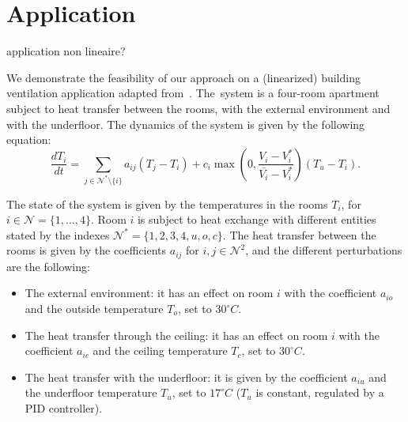  \section{Application}\label{sec:application}

{\todo application non lineaire?}
 
We demonstrate the feasibility of our approach on a (linearized) building
ventilation application adapted from~\cite{meyer:tel-01232640}.
The~system is a four-room apartment subject to heat transfer between
the rooms, with the external environment and with the underfloor.
The dynamics of the system is given by the
following equation:
\begin{equation}
 \frac{d T_i}{dt} = \sum_{j \in \mathcal{N}^\text{*}\setminus \{i\}} a_{ij} (T_j -
 T_i)
 + c_i
 \max\left(0,\frac{V_i - V_i^\text{*}}{\bar{ V_i} -
   V_i^{\text{*}}}\right)(T_u - T_i).
\end{equation}

The state of the system is given by the temperatures in the rooms
$T_i$, for $i \in \mathcal{N} = \{ 1 , \dots , 4 \}$.  Room $i$ is
subject to heat exchange with different entities stated by the indexes
$\mathcal{N}^\text{*} = \{1,2,3,4,u,o,c \}$.
%
The heat
transfer between the rooms is given by the coefficients $a_{ij}$ for
$i,j \in  \mathcal{N}^2$, and the different perturbations are the following:
\begin{itemize}
 \item The external environment: it has an effect on room $i$ with the
   coefficient $a_{io}$ and the outside temperature $T_o$, set to $30^\circ C$.
  \item The heat transfer through the ceiling: it has an effect on
    room $i$ with the coefficient $a_{ic}$ and the ceiling temperature
    $T_c$, set to $30^\circ C$.
  \item The heat transfer with the underfloor: it is given by the
    coefficient $a_{iu}$ and the underfloor temperature $T_u$, set to
    $17^\circ C$ ($T_u$ is constant, regulated by a PID controller).
\end{itemize}

